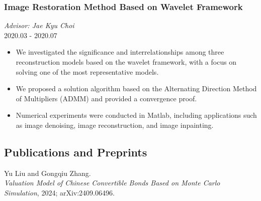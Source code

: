 \documentclass[twocolumn]{article}
\begin{document}
\subsubsection{Image Restoration Method Based on Wavelet Framework}
\textit{Advisor: Jae Kyu Choi} \\
2020.03 - 2020.07 \\
\begin{itemize}
    \item We investigated the significance and interrelationships among three reconstruction models based on the wavelet framework, with a focus on solving one of the most representative models.
    \item We proposed a solution algorithm based on the Alternating Direction Method of Multipliers (ADMM) and provided a convergence proof.
    \item Numerical experiments were conducted in Matlab, including applications such as image denoising, image reconstruction, and image inpainting.
\end{itemize}

\subsection{Publications and Preprints}
Yu Liu and Gongqiu Zhang. \\
\textit{Valuation Model of Chinese Convertible Bonds Based on Monte Carlo Simulation}, 2024; arXiv:2409.06496.
\end{document}
